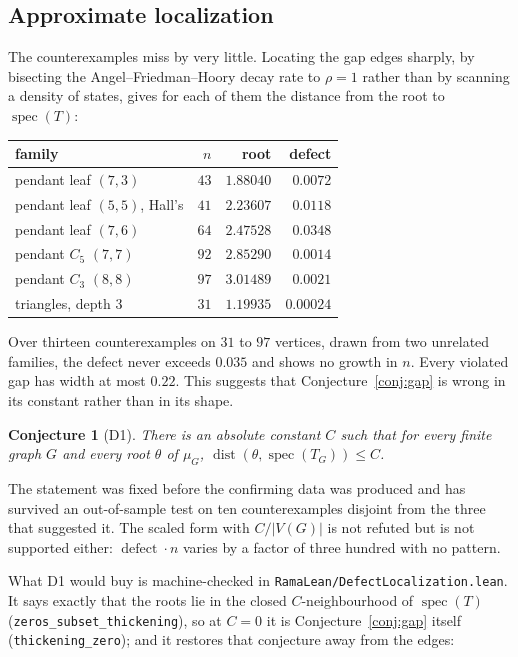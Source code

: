 \documentclass[11pt]{article}
\newtheorem{conjecture}[theorem]{Conjecture}
\theoremstyle{remark}
\begin{document}
\subsection{Approximate localization}\label{sec:defect}

The counterexamples miss by very little. Locating the gap edges sharply, by bisecting the
Angel--Friedman--Hoory decay rate to $\rho=1$ rather than by scanning a density of states,
gives for each of them the distance from the root to $\operatorname{spec}(T)$:

\begin{center}
\begin{tabular}{lrrr}
family & $n$ & root & defect\\\hline
pendant leaf $(7,3)$ & $43$ & $1.88040$ & $0.0072$\\
pendant leaf $(5,5)$, Hall's & $41$ & $2.23607$ & $0.0118$\\
pendant leaf $(7,6)$ & $64$ & $2.47528$ & $0.0348$\\
pendant $C_5$ $(7,7)$ & $92$ & $2.85290$ & $0.0014$\\
pendant $C_3$ $(8,8)$ & $97$ & $3.01489$ & $0.0021$\\
triangles, depth $3$ & $31$ & $1.19935$ & $0.00024$\\
\end{tabular}
\end{center}

Over thirteen counterexamples on $31$ to $97$ vertices, drawn from two unrelated families, the
defect never exceeds $0.035$ and shows no growth in $n$. Every violated gap has width at most
$0.22$. This suggests that Conjecture~\ref{conj:gap} is wrong in its constant rather than in
its shape.

\begin{conjecture}[D1]\label{conj:defect}
There is an absolute constant $C$ such that for every finite graph $G$ and every root $\theta$
of $\mu_G$, $\operatorname{dist}(\theta,\operatorname{spec}(T_G))\le C$.
\end{conjecture}

The statement was fixed before the confirming data was produced and has survived an
out-of-sample test on ten counterexamples disjoint from the three that suggested it. The
scaled form with $C/|V(G)|$ is not refuted but is not supported either: $\operatorname{defect}
\cdot n$ varies by a factor of three hundred with no pattern.

What D1 would buy is machine-checked in \texttt{RamaLean/DefectLocalization.lean}. It says
exactly that the roots lie in the closed $C$-neighbourhood of $\operatorname{spec}(T)$
(\texttt{zeros\_subset\_thickening}), so at $C=0$ it is Conjecture~\ref{conj:gap} itself
(\texttt{thickening\_zero}); and it restores that conjecture away from the edges:
\end{document}
